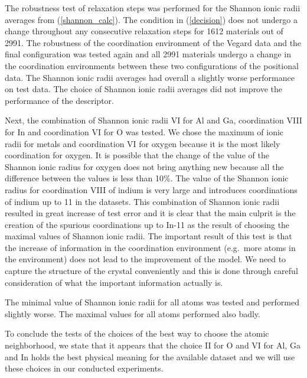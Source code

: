 \documentclass[11pt,oneside,czech,american]{book} %
\theoremstyle{definition} %
\theoremstyle{definition}
\begin{document}
The robustness test of relaxation steps was performed for the Shannon ionic radii averages from (\ref{shannon_calc}). The condition in (\ref{decision}) does not undergo a change throughout any consecutive relaxation steps for 1612 materials out of 2991. The robustness of the coordination environment of the Vegard data and the final configuration was tested again and all 2991 materials undergo a change in the coordination environments between these two configurations of the positional data. The Shannon ionic radii averages had overall a slightly worse performance on test data. The choice of Shannon ionic radii averages did not improve the performance of the descriptor.

Next, the combination of Shannon ionic radii VI for Al and Ga, coordination VIII for In and coordination VI for O was tested. We chose the maximum of ionic radii for metals and coordination VI for oxygen because it is the most likely coordination for oxygen. It is possible that the change of the value of the Shannon ionic radius for oxygen does not bring anything new because all the difference between the values is less than 10\%. The value of the Shannon ionic radius for coordination VIII of indium is very large and introduces coordinations of indium up to 11 in the datasets. This combination of Shannon ionic radii resulted in great increase of test error and it is clear that the main culprit is the creation of the spurious coordinations up to In-11 as the result of choosing the maximal values of Shannon ionic radii. The important result of this test is that the increase of information in the coordination environment (e.g.\ more atoms in the environment) does not lead to the improvement of the model. We need to capture the structure of the crystal conveniently and this is done through careful consideration of what the important information actually is.

The minimal value of Shannon ionic radii for all atoms was tested and performed slightly worse. The maximal values for all atoms performed also badly.

To conclude the tests of the choices of the best way to choose the atomic neighborhood, we state that it appears that the choice II for O and VI for Al, Ga and In holds the best physical meaning for the available dataset and we will use these choices in our conducted experiments.
\end{document}
